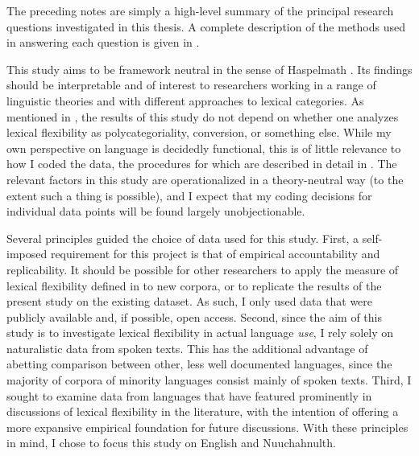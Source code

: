The preceding notes are simply a high-level summary of the principal research questions investigated in this thesis. A complete description of the methods used in answering each question is given in .

This study aims to be framework neutral in the sense of Haspelmath . Its findings should be interpretable and of interest to researchers working in a range of linguistic theories and with different approaches to lexical categories. As mentioned in , the results of this study do not depend on whether one analyzes lexical flexibility as polycategoriality, conversion, or something else. While my own perspective on language is decidedly functional, this is of little relevance to how I coded the data, the procedures for which are described in detail in . The relevant factors in this study are operationalized in a theory-neutral way (to the extent such a thing is possible), and I expect that my coding decisions for individual data points will be found largely unobjectionable.

Several principles guided the choice of data used for this study. First, a self-imposed requirement for this project is that of empirical accountability and replicability. It should be possible for other researchers to apply the measure of lexical flexibility defined in  to new corpora, or to replicate the results of the present study on the existing dataset. As such, I only used data that were publicly available and, if possible, open access. Second, since the aim of this study is to investigate lexical flexibility in actual language \emph{use}, I rely solely on naturalistic data from spoken texts. This has the additional advantage of abetting comparison between other, less well documented languages, since the majority of corpora of minority languages consist mainly of spoken texts. Third, I sought to examine data from languages that have featured prominently in discussions of lexical flexibility in the literature, with the intention of offering a more expansive empirical foundation for future discussions. With these principles in mind, I chose to focus this study on English and Nuuchahnulth.

